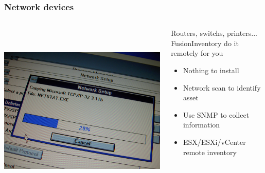 \documentclass{beamer}
\begin{document}
\begin{frame}

    \frametitle{Network devices}


 \begin{columns}
 \begin{column}{0.15\textwidth}
         \includegraphics[height=8.5cm]{./pics/networking.jpg}
 \end{column}
 \begin{column}{1.25\textwidth}
    

    \begin{block}{Routers, switchs, printers... \\
    FusionInventory do it remotely for you}
        \begin{itemize}
            \item Nothing to install
            \item Network scan to identify asset
            \item Use SNMP to collect information
            \item ESX/ESXi/vCenter remote inventory
        \end{itemize}
    \end{block}

 \end{column}
\end{columns}
\end{frame}
\end{document}
